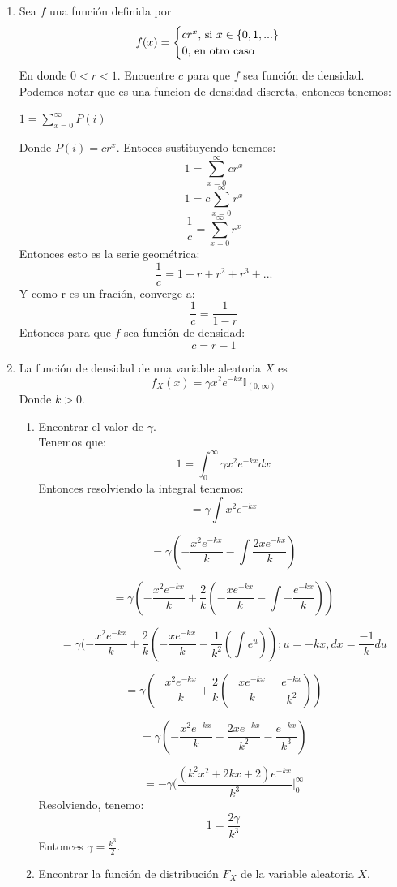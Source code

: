 \documentclass[12pt,a4paper]{report}
\begin{document}
\begin{enumerate}
		\item {
			Sea $f$ una función definida por
			\[
				f(x) = \begin{cases}
								cr^x, $ si $ x \in \{0, 1, ...\}\\
								0, $ en otro caso$
							 \end{cases}
			\]
			En donde $0 < r < 1$. Encuentre $c$ para que $f$ sea función de densidad.\\
			Podemos notar que es una funcion de densidad discreta, entonces tenemos:
			\begin{center}
			    $1 = \sum_{x=0}^{\infty} P(i)$
		    \end{center}
		    Donde $P(i) = cr^{x}$. Entoces sustituyendo tenemos:
		    \[1 = \sum_{x=0}^{\infty} cr^{x}\]
		    \[1 = c\sum_{x=0}^{\infty} r^{x}\]
		    \[\frac{1}{c} = \sum_{x=0}^{\infty} r^{x}\]
		    Entonces esto es la serie geométrica:
		    \[\frac{1}{c} = 1 + r + r^{2} + r^{3} + ...\]
		    Y como r es un fración, converge a:
		    \[\frac{1}{c} = \frac{1}{1-r}\]
		    Entonces para que $f$ sea función de densidad:
		    \[c = r-1\]
		}

		\item {
		La función de densidad de una variable aleatoria $X$ es
		\[f_X(x) = \gamma x^2 e^{-kx}\mathbb{I}_{(0, \infty)}\]
		Donde $k > 0$.
		\begin{enumerate}
			\item {
				Encontrar el valor de $\gamma$.\\
				Tenemos que:
    			\[1 = \int_{0}^{\infty} \gamma x^2 e^{-kx} dx\]
    			Entonces resolviendo la integral tenemos:
    			\[= \gamma \int x^{2}e^{-kx}\]

    			\[= \gamma (- \frac{x^{2}e^{-kx}}{k} - \int \frac{2xe^{-kx}}{k})\]

    			\[= \gamma (- \frac{x^{2}e^{-kx}}{k} + \frac{2}{k}(-\frac{xe^{-kx}}{k}- \int -
    				\frac{e^{-kx}}{k}))\]

    		    \[= \gamma (- \frac{x^{2}e^{-kx}}{k} + \frac{2}{k}(-\frac{xe^{-kx}}{k}- \frac{1}{k^{2}} ( \int e^{u})); u = -kx , dx = \frac{-1}{k}du\]

    			\[= \gamma (- \frac{x^{2}e^{-kx}}{k} + \frac{2}{k}(-\frac{xe^{-kx}}{k}- \frac{e^{-kx}}{k^{2}}))\]

    			\[= \gamma (- \frac{x^{2}e^{-kx}}{k} - \frac{2xe^{-kx}}{k^{2}}- \frac{e^{-kx}}{k^{3}})\]

    			\[ = -\gamma (\frac{(k^{2}x^{2} + 2kx + 2)e^{-kx}}{k^{3}}\Big|_0^\infty \]
    			Resolviendo, tenemo:
    			\[ 1 = \frac{2\gamma}{k^{3}}\]
    			Entonces $\gamma = \frac{k^{3}}{2}$.
			}
			\item {
				Encontrar la función de distribución $F_X$ de la variable aleatoria
				$X$.\\

}
\end{enumerate}}
\end{enumerate}
\end{document}

